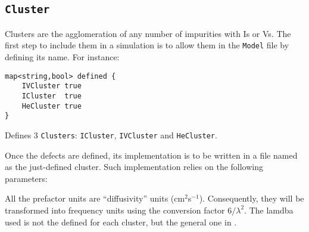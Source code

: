 \subsection{\tt Cluster}
Clusters are the agglomeration of any number of impurities with Is or Vs. The first step to include them in a simulation is to allow them in the {\tt Model} file by defining its name. For instance:

\begin{lstlisting}
map<string,bool> defined { 
	IVCluster true 
	ICluster  true
	HeCluster true
}
\end{lstlisting}

Defines 3 {\tt Clusters}: {\tt ICluster}, {\tt IVCluster} and {\tt HeCluster}. 

Once the defects are defined, its implementation is to be written in a file named as the just-defined cluster. Such implementation relies on the following parameters:

All the prefactor units are ``diffusivity'' units (cm$^2$s$^{-1}$). Consequently, they will be transformed into frequency units using the conversion factor $6/\lambda^2$. The lamdba used is not the  defined for each cluster, but the general one in .

